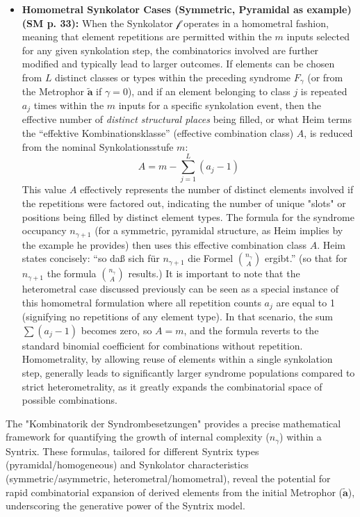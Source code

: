 \documentclass[12pt]{article}
\newcommand{\q}[1]{\enquote{#1}}
\newcommand{\metrophor}{\bm{\widetilde{a}}}
\newcommand{\synkolator}{\mathcal{f}}
\newcommand{\synkolationsstufe}{m}
\newcommand{\syndrom}{F} %
\begin{document}
\begin{itemize}
    \item \textbf{Homometral Synkolator Cases (Symmetric, Pyramidal as example) (SM p. 33):}
    When the Synkolator \( \synkolator \) operates in a homometral fashion, meaning that element repetitions are permitted within the \( \synkolationsstufe \) inputs selected for any given synkolation step, the combinatorics involved are further modified and typically lead to larger outcomes. If elements can be chosen from \( L \) distinct classes or types within the preceding syndrome \( \syndrom_\gamma \) (or from the Metrophor \( \metrophor \) if \( \gamma=0 \)), and if an element belonging to class \( j \) is repeated \( a_j \) times within the \( \synkolationsstufe \) inputs for a specific synkolation event, then the effective number of \textit{distinct structural places} being filled, or what Heim terms the \q{effektive Kombinationsklasse} (effective combination class) \( A \), is reduced from the nominal Synkolationsstufe \( \synkolationsstufe \):
    \begin{equation*}
    A = \synkolationsstufe - \sum_{j=1}^L (a_j - 1)
    \end{equation*}
    This value \( A \) effectively represents the number of distinct elements involved if the repetitions were factored out, indicating the number of unique "slots" or positions being filled by distinct element types. The formula for the syndrome occupancy \( n_{\gamma+1} \) (for a symmetric, pyramidal structure, as Heim implies by the example he provides) then uses this effective combination class \( A \). Heim states concisely: \q{so daß sich für \( n_{\gamma+1} \) die Formel \( \binom{n_\gamma}{A} \) ergibt.} (so that for \( n_{\gamma+1} \) the formula \( \binom{n_\gamma}{A} \) results.)
    It is important to note that the heterometral case discussed previously can be seen as a special instance of this homometral formulation where all repetition counts \( a_j \) are equal to 1 (signifying no repetitions of any element type). In that scenario, the sum \( \sum (a_j - 1) \) becomes zero, so \( A = \synkolationsstufe \), and the formula reverts to the standard binomial coefficient for combinations without repetition. Homometrality, by allowing reuse of elements within a single synkolation step, generally leads to significantly larger syndrome populations compared to strict heterometrality, as it greatly expands the combinatorial space of possible combinations.
\end{itemize}

The "Kombinatorik der Syndrombesetzungen" provides a precise mathematical framework for quantifying the growth of internal complexity (\(n_\gamma\)) within a Syntrix. These formulas, tailored for different Syntrix types (pyramidal/homogeneous) and Synkolator characteristics (symmetric/asymmetric, heterometral/homometral), reveal the potential for rapid combinatorial expansion of derived elements from the initial Metrophor (\(\metrophor\)), underscoring the generative power of the Syntrix model.
\end{document}
